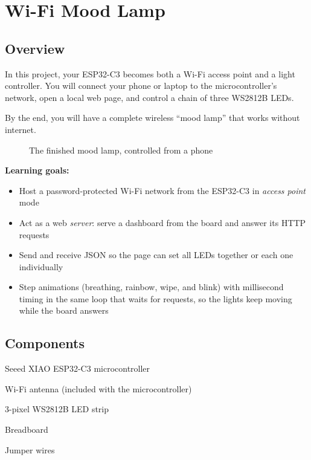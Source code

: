 \chapter{Wi-Fi Mood Lamp}

\section{Overview}
In this project, your ESP32-C3 becomes both a Wi-Fi access point and a light controller.
You will connect your phone or laptop to the microcontroller's network, open a local web page,
and control a chain of three WS2812B LEDs.

By the end, you will have a complete wireless ``mood lamp'' that works without internet.

\begin{figure}[H]
\centering
    \caption{The finished mood lamp, controlled from a phone}
\end{figure}

\begin{tcolorbox}[colback=blue!5!white,colframe=blue!40!black]
    \textbf{Learning goals:}
    \begin{itemize}
        \item Host a password-protected Wi-Fi network from the ESP32-C3 in \emph{access point} mode
        \item Act as a web \emph{server}: serve a dashboard from the board and answer its HTTP requests
        \item Send and receive JSON so the page can set all LEDs together or each one individually
        \item Step animations (breathing, rainbow, wipe, and blink) with millisecond timing in the same
              loop that waits for requests, so the lights keep moving while the board answers
    \end{itemize}
\end{tcolorbox}

\pagebreak

\section{Components}

\begin{components}
    \item Seeed XIAO ESP32-C3 microcontroller
    \item Wi-Fi antenna (included with the microcontroller)
    \item 3-pixel WS2812B LED strip
    \item Breadboard
    \item Jumper wires
\end{components}

